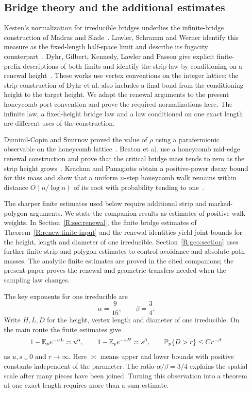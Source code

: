 \subsection*{Bridge theory and the additional estimates}
Kesten's normalization for irreducible bridges underlies the infinite-bridge construction of Madras and Slade~\cite{Kesten1963,MadrasSlade1993}. Lawler, Schramm and Werner identify this measure as the fixed-length half-space limit and describe its fugacity counterpart~\cite[Appendix]{LSW2004}. Dyhr, Gilbert, Kennedy, Lawler and Passon give explicit finite-prefix descriptions of both limits and identify the strip law by conditioning on a renewal height~\cite[Propositions~2.2--2.3, 2.9 and~2.10]{Dyhr2011}. These works use vertex conventions on the integer lattice; the strip construction of Dyhr et al. also includes a final bond from the conditioning height to the target height. We adapt the renewal arguments to the present honeycomb port convention and prove the required normalizations here. The infinite law, a fixed-height bridge law and a law conditioned on one exact length are different uses of the construction.

Duminil-Copin and Smirnov proved the value of $\rho$ using a parafermionic observable on the honeycomb lattice~\cite{DCS2012}. Beaton et al. use a honeycomb mid-edge renewal construction and prove that the critical bridge mass tends to zero as the strip height grows~\cite[Theorem~10 and Appendix]{BeatonEtAl2014}. Krachun and Panagiotis obtain a positive-power decay bound for this mass and show that a uniform $n$-step honeycomb walk remains within distance $O(n/\log n)$ of its root with probability tending to one~\cite{KrachunPanagiotis2026}.

The sharper finite estimates used below require additional strip and marked-polygon arguments. We state the companion results as estimates of positive walk weights. In Section~\ref{R:sec:renewal}, the finite bridge estimates of Theorem~\ref{R:renew:finite-input} and the renewal identities yield joint bounds for the height, length and diameter of one irreducible. Section~\ref{R:geo:section} uses further finite strip and polygon estimates to control avoidance and absolute path masses. The analytic finite estimates are proved in the cited companions; the present paper proves the renewal and geometric transfers needed when the sampling law changes.

The key exponents for one irreducible are
\[
 \alpha=\frac9{16},\qquad \beta=\frac34.
\]
Write $H,L,D$ for the height, vertex length and diameter of one irreducible. On the main route the finite estimates give
\[
 1-\mathbb E_p e^{-uL}\asymp u^\alpha,\qquad
 1-\mathbb E_p e^{-sH}\asymp s^\beta,\qquad
 \mathbb P_p\{D>r\}\le Cr^{-\beta}
\]
as $u,s\downarrow0$ and $r\to\infty$. Here $\asymp$ means upper and lower bounds with positive constants independent of the parameter. The ratio $\alpha/\beta=3/4$ explains the spatial scale after many pieces have been joined. Turning this observation into a theorem at one exact length requires more than a sum estimate.

